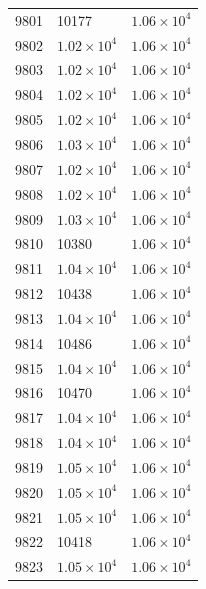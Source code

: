 \begin{table}[H]
\begin{tabular}{lll}
9801 & 10177 & $\displaystyle 1.06 \times 10^{4}$ \\
9802 & $\displaystyle 1.02 \times 10^{4}$ & $\displaystyle 1.06 \times 10^{4}$ \\
9803 & $\displaystyle 1.02 \times 10^{4}$ & $\displaystyle 1.06 \times 10^{4}$ \\
9804 & $\displaystyle 1.02 \times 10^{4}$ & $\displaystyle 1.06 \times 10^{4}$ \\
9805 & $\displaystyle 1.02 \times 10^{4}$ & $\displaystyle 1.06 \times 10^{4}$ \\
9806 & $\displaystyle 1.03 \times 10^{4}$ & $\displaystyle 1.06 \times 10^{4}$ \\
9807 & $\displaystyle 1.02 \times 10^{4}$ & $\displaystyle 1.06 \times 10^{4}$ \\
9808 & $\displaystyle 1.02 \times 10^{4}$ & $\displaystyle 1.06 \times 10^{4}$ \\
9809 & $\displaystyle 1.03 \times 10^{4}$ & $\displaystyle 1.06 \times 10^{4}$ \\
9810 & 10380 & $\displaystyle 1.06 \times 10^{4}$ \\
9811 & $\displaystyle 1.04 \times 10^{4}$ & $\displaystyle 1.06 \times 10^{4}$ \\
9812 & 10438 & $\displaystyle 1.06 \times 10^{4}$ \\
9813 & $\displaystyle 1.04 \times 10^{4}$ & $\displaystyle 1.06 \times 10^{4}$ \\
9814 & 10486 & $\displaystyle 1.06 \times 10^{4}$ \\
9815 & $\displaystyle 1.04 \times 10^{4}$ & $\displaystyle 1.06 \times 10^{4}$ \\
9816 & 10470 & $\displaystyle 1.06 \times 10^{4}$ \\
9817 & $\displaystyle 1.04 \times 10^{4}$ & $\displaystyle 1.06 \times 10^{4}$ \\
9818 & $\displaystyle 1.04 \times 10^{4}$ & $\displaystyle 1.06 \times 10^{4}$ \\
9819 & $\displaystyle 1.05 \times 10^{4}$ & $\displaystyle 1.06 \times 10^{4}$ \\
9820 & $\displaystyle 1.05 \times 10^{4}$ & $\displaystyle 1.06 \times 10^{4}$ \\
9821 & $\displaystyle 1.05 \times 10^{4}$ & $\displaystyle 1.06 \times 10^{4}$ \\
9822 & 10418 & $\displaystyle 1.06 \times 10^{4}$ \\
9823 & $\displaystyle 1.05 \times 10^{4}$ & $\displaystyle 1.06 \times 10^{4}$ \\

\end{tabular}
\end{table}

